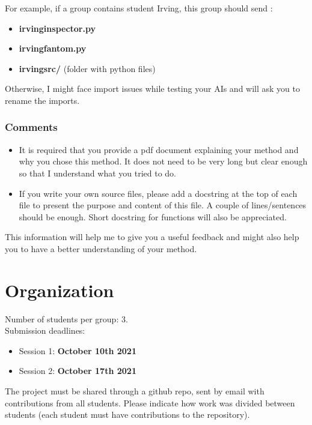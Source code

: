 \documentclass[
10pt, %
a4paper, %
oneside, %
headinclude,footinclude, %
BCOR5mm, %
]{scrartcl}
\begin{document}
For example, if a group contains student Irving, this group should send :
\begin{itemize}
    \item \textbf{{irving\textunderscore inspector.py}} 
    \item \textbf{{irving\textunderscore fantom.py}} 
    \item \textbf{{irving\textunderscore src/}}  (folder with python files)
\end{itemize}

Otherwise, I might face import issues while testing your AIs and will ask you to rename the imports.

\subsubsection{\large\color{BlueViolet}Comments}

\begin{itemize}
    \item It is required that you provide a pdf document explaining your method and why you chose this method. It does not need to be very long but clear enough so that I understand what you tried to do.
    \item If you write your own source files, please add a docstring at the top of each file to present the purpose and content of this file. A couple of lines/sentences should be enough. Short docstring for functions will also be appreciated.
\end{itemize}

This information will help me to give you a useful feedback and might also help you to have a better understanding of your method.

\label{sec:date}
\section{\large\color{Blue}Organization}

Number of students per group: 3.
\\

Submission deadlines:
\begin{itemize}
    \item Session 1: \textbf{{October 10th 2021}} 
    \item Session 2: \textbf{{October 17th 2021}} 
\end{itemize}

The project must be shared through a github repo, sent by email with contributions from all students.  Please indicate how work was divided between students (each student must have contributions to the repository).
\\
\end{document}
